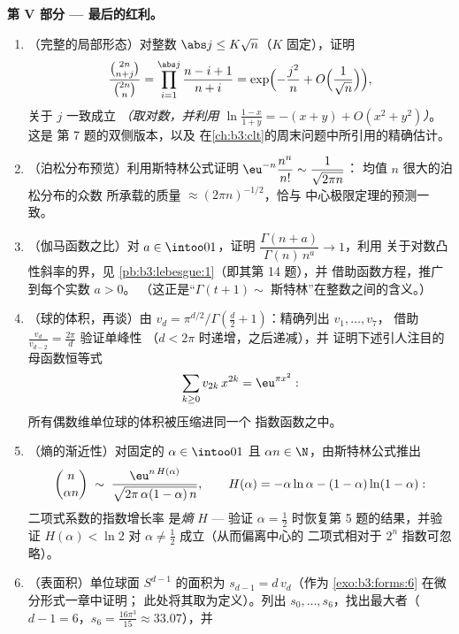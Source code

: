 \begin{problem}
\medskip
\noindent\textbf{第 V 部分 --- 最后的红利。}
\begin{enumerate}[resume]
  \item （完整的局部形态）对整数 $\abs j \leq
        K\sqrt n$（$K$ 固定），证明
        \[
        \frac{\binom{2n}{n+j}}{\binom{2n}{n}} =
        \prod_{i=1}^{\abs j}\frac{n - i + 1}{n + i}
        = \exp\Bigl(-\frac{j^2}n +
        O\Bigl(\frac1{\sqrt n}\Bigr)\Bigr),
        \]
        关于 $j$ 一致成立 \emph{（取对数，并利用 $\ln
        \frac{1-x}{1+y} = -(x + y) + O(x^2 + y^2)$）}。这是
        第 7 题的双侧版本，以及
        在\cref{ch:b3:clt}的周末问题中所引用的精确估计。
  \item （泊松分布预览）利用斯特林公式证明
        $\eu^{-n}\dfrac{n^n}{n!} \sim \dfrac1{\sqrt{2\pi n}}$：
        均值 $n$ 很大的泊松分布的众数
        所承载的质量 $\approx (2\pi n)^{-1/2}$，恰与
        中心极限定理的预测一致。
  \item （伽马函数之比）对 $a \in \intoo01$，证明
        $\dfrac{\Gamma(n + a)}{\Gamma(n)\,n^a} \to 1$，利用
        关于对数凸性斜率的界，见
        \cref{pb:b3:lebesgue:1}（即其第 14 题），并
        借助函数方程，推广到每个实数 $a > 0$。
        （这正是“$\Gamma(t+1) \sim$
        斯特林”在整数之间的含义。）
  \item （球的体积，再谈）由 $v_d = \pi^{d/2}/\Gamma(\frac d2
        + 1)$：精确列出 $v_1, \dots, v_7$，
        借助 $\frac{v_d}{v_{d-2}} = \frac{2\pi}d$ 验证单峰性
        （$d < 2\pi$ 时递增，之后递减），并
        证明下述引人注目的母函数恒等式
        \[
        \sum_{k\geq0}v_{2k}\,x^{2k} = \eu^{\pi x^2} :
        \]
        所有偶数维单位球的体积被压缩进同一个
        指数函数之中。
  \item （熵的渐近性）对固定的 $\alpha \in \intoo01$
        且 $\alpha n \in \N$，由斯特林公式推出
        \[
        \binom{n}{\alpha n} \;\sim\;
        \frac{\eu^{n\,H(\alpha)}}
        {\sqrt{2\pi\,\alpha(1-\alpha)\,n}},
        \qquad
        H(\alpha) = -\alpha\ln\alpha -
        (1-\alpha)\ln(1-\alpha) :
        \]
        二项式系数的指数增长率
        是\emph{熵} $H$ --- 验证 $\alpha =
        \frac12$ 时恢复第 5 题的结果，并验证 $H(\alpha) <
        \ln2$ 对 $\alpha \neq \frac12$ 成立（从而偏离中心的
        二项式相对于 $2^n$ 指数可忽略）。
  \item （表面积）单位球面 $S^{d-1}$
        的面积为 $s_{d-1} = d\,v_d$（作为
        \cref{exo:b3:forms:6} 在微分形式一章中证明；
        此处将其取为定义）。列出
        $s_0, \dots, s_6$，找出最大者（$d - 1 =
        6$，$s_6 = \frac{16\pi^3}{15} \approx 33.07$），并

\end{enumerate}
\end{problem}
